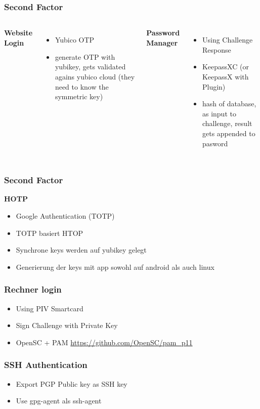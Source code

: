 \documentclass{beamer}
\begin{document}
\begin{frame}
\frametitle{Second Factor}
	\begin{columns}
			\textbf{Website Login}
				\begin{itemize}
					\item{Yubico OTP}
					\item{generate OTP with yubikey, gets validated agains yubico cloud (they need to know the symmetric key)}
				\end{itemize}
		\pause
			\textbf{Password Manager}
				\begin{itemize}
					\item{Using Challenge Response}
					\item{KeepassXC (or KeepassX with Plugin)}
					\item{hash of database, as input to challenge, result gets appended to pasword}
				\end{itemize}
	\end{columns}
\end{frame}

\begin{frame}
\frametitle{Second Factor}
	\textbf{HOTP}
		\begin{itemize}
			\item{Google Authentication (TOTP)}
			\item{TOTP basiert HTOP}
			\item{Synchrone keys werden auf yubikey gelegt}
			\item{Generierung der keys mit app sowohl auf android als auch linux}
		\end{itemize}
\end{frame}

\begin{frame}
\frametitle{Rechner login}
	\begin{itemize}
		\item{Using PIV Smartcard}
		\item{Sign Challenge with Private Key}
		\item{OpenSC + PAM \url{https://github.com/OpenSC/pam_p11}}
	\end{itemize}
\end{frame}

\begin{frame}
\frametitle{SSH Authentication}
	\begin{itemize}
		\item{Export PGP Public key as SSH key}
		\item{Use gpg-agent als ssh-agent}
	\end{itemize}
\end{frame}
\end{document}
